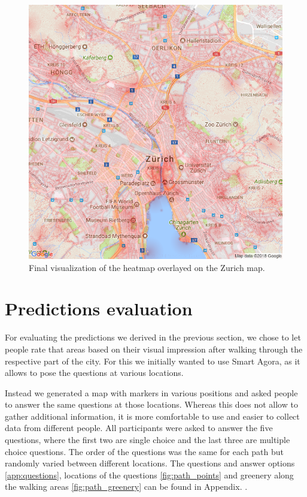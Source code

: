 \documentclass[letterpaper]{article}
\begin{document}
\begin{figure}
    \centering
     \includegraphics[width=.95\linewidth]{images/combined_all.png}
    \caption{Final visualization of the heatmap overlayed on the Zurich map.}
    \label{fig:ZurichVisualization}
\end{figure}

\section{Predictions evaluation}\label{sec:exp}
For evaluating the predictions we derived in the previous section, we chose to let people rate 
that areas based on their visual impression after walking through the respective part of the city. 
For this we initially wanted to use Smart Agora, as it allows to pose the questions at various locations.

Instead we generated a map with markers in various positions and asked people to answer the same questions at those locations. 
Whereas this does not allow to gather additional information, it is more comfortable to use and easier to collect data from 
different people. All participants were asked to answer the five questions, where the first two are single choice 
and the last three are multiple choice questions. The order of the questions was the same for each path but randomly varied 
between different locations. The questions and answer options \ref{app:questions}, locations of the questions \ref{fig:path_points}
and greenery along the walking areas \ref{fig:path_greenery} can be found in Appendix. .
\end{document}
